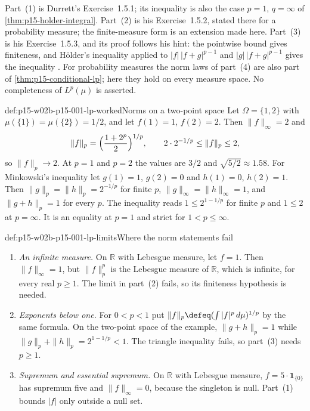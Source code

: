 Part~(1) is Durrett's Exercise~1.5.1; its inequality is also the case
\(p=1\), \(q=\infty\) of \cref{thm:p15-holder-integral}. Part~(2) is
his Exercise~1.5.2, stated there for a probability measure; the
finite-measure form is an extension made here. Part~(3) is his
Exercise~1.5.3, and its proof follows his hint: the pointwise bound
gives finiteness, and H\"older's inequality applied to
\(|f|\,|f+g|^{p-1}\) and \(|g|\,|f+g|^{p-1}\) gives the inequality
\cite[p.~28]{DurrettPTEAuthor2019}. For probability measures the norm
laws of part~(4) are also part of \cref{thm:p15-conditional-lp}; here
they hold on every measure space. No completeness of \(L^p(\mu)\) is
asserted.

\begin{hbexample}{def:p15-w02b-p15-001-lp-worked}{Norms on a two-point space}
Let \(\Omega=\{1,2\}\) with \(\mu(\{1\})=\mu(\{2\})=1/2\), and let
\(f(1)=1\), \(f(2)=2\). Then \(\|f\|_\infty=2\) and
\[
 \|f\|_p=\Bigl(\frac{1+2^p}2\Bigr)^{1/p},\qquad
 2\cdot2^{-1/p}\leq\|f\|_p\leq2,
\]
so \(\|f\|_p\to2\). At \(p=1\) and \(p=2\) the values are \(3/2\) and
\(\sqrt{5/2}\approx1.58\). For Minkowski's inequality let
\(g(1)=1\), \(g(2)=0\) and \(h(1)=0\), \(h(2)=1\). Then
\(\|g\|_p=\|h\|_p=2^{-1/p}\) for finite \(p\),
\(\|g\|_\infty=\|h\|_\infty=1\), and \(\|g+h\|_p=1\) for every \(p\).
The inequality reads \(1\leq2^{1-1/p}\) for finite \(p\) and
\(1\leq2\) at \(p=\infty\). It is an equality at \(p=1\) and strict for
\(1<p\leq\infty\).
\end{hbexample}

\begin{hbwarning}{def:p15-w02b-p15-001-lp-limits}{Where the norm statements fail}
\par\nobreak
\begin{enumerate}
\item \emph{An infinite measure.} On \(\mathbb R\) with Lebesgue
      measure, let \(f=1\). Then \(\|f\|_\infty=1\), but
      \(\|f\|_p^p\) is the Lebesgue measure of \(\mathbb R\), which is
      infinite, for every real \(p\geq1\). The limit in part~(2) fails, so its finiteness
      hypothesis is needed.
\item \emph{Exponents below one.} For \(0<p<1\) put
      \(\|f\|_p\defeq(\int|f|^p\,d\mu)^{1/p}\) by the same formula.
      On the two-point space of the example, \(\|g+h\|_p=1\) while
      \(\|g\|_p+\|h\|_p=2^{1-1/p}<1\). The triangle inequality fails,
      so part~(3) needs \(p\geq1\).
\item \emph{Supremum and essential supremum.} On \(\mathbb R\) with
      Lebesgue measure, \(f=5\cdot\mathbf1_{\{0\}}\) has supremum five
      and \(\|f\|_\infty=0\), because the singleton is null. Part~(1)
      bounds \(|f|\) only outside a null set.
\end{enumerate}
\end{hbwarning}

